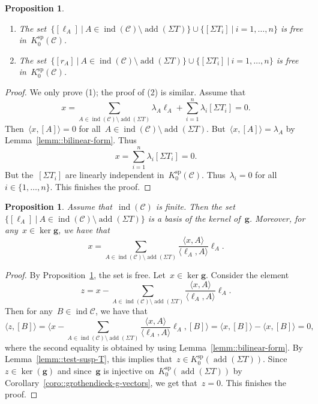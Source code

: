 \documentclass{amsart}
\newtheorem{proposition}[theorem]{Proposition}
\theoremstyle{definition}
\renewcommand{\b}[1]{{\boldsymbol{#1}}} %
\newcommand{\cat}{\mathcal{C}}
\newcommand{\susp}{\Sigma}
\newcommand{\add}{\operatorname{add}}
\newcommand{\spl}{\operatorname{sp}}
\newcommand{\Ksp}{K_0^{\spl}}
\newcommand{\ind}{\operatorname{ind}}
\begin{document}
\begin{proposition}\label{prop::free-set}
 \begin{enumerate}
  \item The set~$\{[\ell_A] \ | \ A\in \ind(\cat) \setminus \add(\susp T) \} \cup \{[\susp T_i] \ | \ i=1, \ldots, n\}$ is free in~$\Ksp(\cat)$.
  \item The set~$\{[r_A] \ | \ A\in \ind(\cat) \setminus \add(\susp T) \} \cup \{[\susp T_i] \ | \ i=1, \ldots, n\}$ is free in~$\Ksp(\cat)$.
 \end{enumerate}
\end{proposition}
\begin{proof}
 We only prove (1); the proof of (2) is similar.  Assume that~
 \[
  x= \sum_{A\in \ind(\cat) \setminus \add(\susp T)} \lambda_A \ell_A + \sum_{i=1}^n \lambda_i [\susp T_i] = 0.
 \]
 Then~$\langle x, [A] \rangle = 0$ for all~$A\in\ind(\cat) \setminus \add(\susp T)$.  But~$\langle x, [A] \rangle = \lambda_A$ by Lemma~\ref{lemm::bilinear-form}.  Thus~
 \[
  x = \sum_{i=1}^n \lambda_i [\susp T_i] = 0.
 \]
 But the~$[\susp T_i]$ are linearly independent in~$\Ksp(\cat)$.  Thus~$\lambda_i = 0$ for all~$i\in \{1, \ldots, n\}$.  This finishes the proof.
\end{proof}

\begin{proposition}
 Assume that~$\ind(\cat)$ is finite.  Then the set~$\{[\ell_A] \ | \ A\in \ind(\cat) \setminus \add(\susp T) \}$ is a basis of the kernel of~$\b g$.  Moreover, for any~$x\in \ker \b g$, we have that
 \[
  x= \sum_{A\in \ind(\cat) \setminus \add(\susp T)} \frac{\langle x, A \rangle}{\langle \ell_A, A \rangle} \ell_A.
 \]
\end{proposition}
\begin{proof}
By Proposition~\ref{prop::free-set}, the set is free.  Let~$x\in \ker \b g$.  Consider the element
\[
 z = x- \sum_{A\in \ind(\cat) \setminus \add(\susp T)} \frac{\langle x, A \rangle}{\langle \ell_A, A \rangle} \ell_A.
\]
Then for any~$B\in \ind{\cat}$, we have that
\[
 \langle  z, [B] \rangle = \Big\langle x- \sum_{A\in \ind(\cat) \setminus \add(\susp T)} \frac{\langle x, A \rangle}{\langle \ell_A, A \rangle} \ell_A, [B] \Big\rangle = \langle x, [B] \rangle - \langle x, [B] \rangle = 0, 
\]
where the second equality is obtained by using Lemma~\ref{lemm::bilinear-form}.  By Lemma~\ref{lemm::test-susp-T}, this implies that~$z\in \Ksp(\add(\susp T))$.  Since~$z\in \ker(\b g)$ and since~$\b g$ is injective on~$\Ksp(\add (\susp T))$ by Corollary~\ref{coro::grothendieck-g-vectors}, we get that~$z=0$.  This finishes the proof.
\end{proof}
\end{document}
